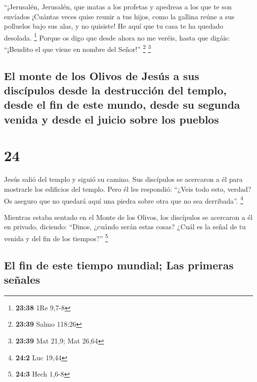  ``¡Jerusalén, Jerusalén, que matas a los profetas y
apedreas a los que te son envíados ¡Cuántas veces quise reunir a tus
hijos, como la gallina reúne a sus polluelos bajo sus alas, y no
quisiste!  He aquí que tu casa te ha quedado desolada.
\footnote{\textbf{23:38} 1Re 9,7-8}  Porque os digo que
desde ahora no me veréis, hasta que digáis: ``¡Bendito el que viene en
nombre del Señor!'' \footnote{\textbf{23:39} Salmo 118:26} \footnote{\textbf{23:39}
  Mat 21,9; Mat 26,64}

\hypertarget{el-monte-de-los-olivos-de-jesuxfas-a-sus-discuxedpulos-desde-la-destrucciuxf3n-del-templo-desde-el-fin-de-este-mundo-desde-su-segunda-venida-y-desde-el-juicio-sobre-los-pueblos}{%
\subsection{El monte de los Olivos de Jesús a sus discípulos desde la
destrucción del templo, desde el fin de este mundo, desde su segunda
venida y desde el juicio sobre los
pueblos}\label{el-monte-de-los-olivos-de-jesuxfas-a-sus-discuxedpulos-desde-la-destrucciuxf3n-del-templo-desde-el-fin-de-este-mundo-desde-su-segunda-venida-y-desde-el-juicio-sobre-los-pueblos}}

\hypertarget{section-23}{%
\section{24}\label{section-23}}

 Jesús salió del templo y siguió su camino. Sus discípulos
se acercaron a él para mostrarle los edificios del templo.
 Pero él les respondió: ``¿Veis todo esto, verdad? Os
aseguro que no quedará aquí una piedra sobre otra que no sea
derribada''. \footnote{\textbf{24:2} Luc 19,44}

 Mientras estaba sentado en el Monte de los Olivos, los
discípulos se acercaron a él en privado, diciendo: ``Dinos, ¿cuándo
serán estas cosas? ¿Cuál es la señal de tu venida y del fin de los
tiempos?'' \footnote{\textbf{24:3} Hech 1,6-8}

\hypertarget{el-fin-de-este-tiempo-mundial-las-primeras-seuxf1ales}{%
\subsection{El fin de este tiempo mundial; Las primeras
señales}\label{el-fin-de-este-tiempo-mundial-las-primeras-seuxf1ales}}

